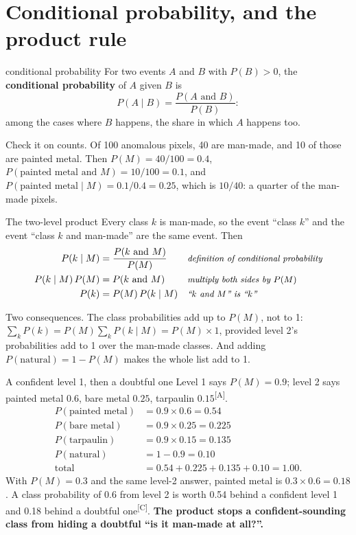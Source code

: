 \documentclass[11pt,a4paper,oneside,openany]{book}
\newcommand{\comp}{\textsuperscript{\textsf{\scriptsize[C]}}}
\newcommand{\assm}{\textsuperscript{\textsf{\scriptsize[A]}}}
\newcommand{\why}[1]{&&\text{\small\itshape #1}}
\begin{document}
\section{Conditional probability, and the product rule}

\begin{defn}{conditional probability}
For two events $A$ and $B$ with $P(B)>0$, the \textbf{conditional probability} of $A$ given $B$ is
\[
  P(A\mid B)=\frac{P(A\text{ and }B)}{P(B)} :
\]
among the cases where $B$ happens, the share in which $A$ happens too.
\end{defn}

Check it on counts. Of 100 anomalous pixels, 40 are man-made, and 10 of those are painted metal. Then $P(M)=40/100=0.4$, $P(\text{painted metal and }M)=10/100=0.1$,
and $P(\text{painted metal}\mid M)=0.1/0.4=0.25$, which is $10/40$: a quarter of the man-made pixels.

\begin{rulebox}[label=rule:twolevel]{The two-level product}
Every class $k$ is man-made, so the event ``class $k$'' and the event ``class $k$ and man-made'' are the same event. Then
\begin{align*}
P(k\mid M) &= \frac{P(k\text{ and }M)}{P(M)} \why{definition of conditional probability}\\
P(k\mid M)\,P(M) &= P(k\text{ and }M) \why{multiply both sides by $P(M)$}\\
P(k) &= P(M)\,P(k\mid M) \why{``$k$ and $M$'' is ``$k$''}
\end{align*}
\end{rulebox}

Two consequences. The class probabilities add up to $P(M)$, not to 1: $\sum_kP(k)=P(M)\sum_kP(k\mid M)=P(M)\times1$, provided level 2's probabilities add to 1 over
the man-made classes. And adding $P(\text{natural})=1-P(M)$ makes the whole list add to 1.

\begin{worked}[label=we:twolevel]{A confident level 1, then a doubtful one}
Level 1 says $P(M)=0.9$; level 2 says painted metal $0.6$, bare metal $0.25$, tarpaulin $0.15$\assm.
\begin{align*}
P(\text{painted metal}) &= 0.9\times0.6=0.54\\
P(\text{bare metal}) &= 0.9\times0.25=0.225\\
P(\text{tarpaulin}) &= 0.9\times0.15=0.135\\
P(\text{natural}) &= 1-0.9=0.10\\
\text{total} &= 0.54+0.225+0.135+0.10=1.00 .
\end{align*}
With $P(M)=0.3$ and the same level-2 answer, painted metal is $0.3\times0.6=0.18$. A class probability of 0.6 from level 2 is worth 0.54 behind a confident level 1 and
0.18 behind a doubtful one\comp. \textbf{The product stops a confident-sounding class from hiding a doubtful ``is it man-made at all?''.}
\end{worked}
\end{document}
